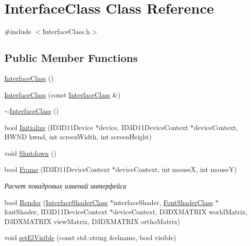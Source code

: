 \hypertarget{class_interface_class}{}\section{Interface\+Class Class Reference}
\label{class_interface_class}


{\ttfamily \#include $<$Interface\+Class.\+h$>$}

\subsection*{Public Member Functions}
\begin{DoxyCompactItemize}
\item 
\hyperlink{class_interface_class_ad7537f339f6790cccd521324ab977590}{Interface\+Class} ()
\item 
\hyperlink{class_interface_class_afbda180a6cbf77c8ca0b137276e22dd2}{Interface\+Class} (const \hyperlink{class_interface_class}{Interface\+Class} \&)
\item 
\hyperlink{class_interface_class_a54008c20f1b9ec01852a9a28732b263b}{$\sim$\+Interface\+Class} ()
\item 
bool \hyperlink{class_interface_class_a897ce52bb001aa6d73f749ed88dfe7eb}{Initialize} (I\+D3\+D11\+Device $\ast$device, I\+D3\+D11\+Device\+Context $\ast$device\+Context, H\+W\+ND hwnd, int screen\+Width, int screen\+Height)
\item 
void \hyperlink{class_interface_class_a5227f3fc42ceb36e86694ad486e5d9f3}{Shutdown} ()
\item 
bool \hyperlink{class_interface_class_a51621bf86e0381d1c59e7ff99d925e6c}{Frame} (I\+D3\+D11\+Device\+Context $\ast$device\+Context, int mouseX, int mouseY)
\begin{DoxyCompactList}\small\item\em Расчет покадровых измений интерфейса \end{DoxyCompactList}\item 
bool \hyperlink{class_interface_class_a57495ade60c15121732b6d7cead8b1b5}{Render} (\hyperlink{class_interface_shader_class}{Interface\+Shader\+Class} $\ast$interface\+Shader, \hyperlink{class_font_shader_class}{Font\+Shader\+Class} $\ast$font\+Shader, I\+D3\+D11\+Device\+Context $\ast$device\+Context, D3\+D\+X\+M\+A\+T\+R\+IX world\+Matrix, D3\+D\+X\+M\+A\+T\+R\+IX view\+Matrix, D3\+D\+X\+M\+A\+T\+R\+IX ortho\+Matrix)
\item 
void \hyperlink{class_interface_class_a0b4d7b8bfcbefbb8b1ec2f6baf8ac2e8}{set\+El\+Visible} (const std\+::string \&elname, bool visible)

\end{DoxyCompactItemize}
